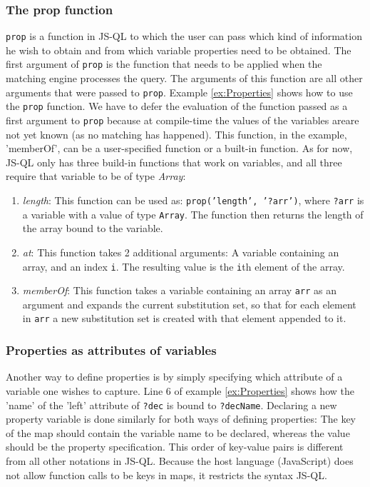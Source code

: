 \subsubsection*{The prop function}
 \texttt{prop} is a function in JS-QL to which the user can pass which kind of information he wish to obtain and from which variable properties need to be obtained. The first argument of \texttt{prop} is the function that needs to be applied when the matching engine processes the query. The arguments of this function are all other arguments that were passed to \texttt{prop}. Example \ref{ex:Properties} shows how to use the \texttt{prop} function. We have to defer the evaluation of the function passed as a first argument to \texttt{prop} because at compile-time the values of the variables areare not yet known (as no matching has happened). This function, in the example, 'memberOf', can be a user-specified function or a built-in function. As for now, JS-QL only has three build-in functions that work on variables, and all three require that variable to be of type \textit{Array}:


\begin{enumerate}
\item \textit{length}: This function can be used as: \texttt{prop('length', '?arr')}, where \texttt{?arr} is a variable with a value of type \texttt{Array}. The function then returns the length of the array bound to the variable.
\item \textit{at}: This function takes 2 additional arguments: A variable containing an array, and an index \texttt{i}. The resulting value is the \texttt{i}th element of the array.
\item \textit{memberOf}: This function takes a variable containing an array \texttt{arr} as an argument and expands the current substitution set, so that for each element in \texttt{arr} a new substitution set is created with that element appended to it.
\end{enumerate}

\subsubsection*{Properties as attributes of variables}
 Another way to define properties is by simply specifying which attribute of a variable one wishes to capture. Line 6 of example \ref{ex:Properties} shows how the 'name' of the 'left' attribute of \texttt{?dec} is bound to \texttt{?decName}. Declaring a new property variable is done similarly for both ways of defining properties: The key of the map should contain the variable name to be declared, whereas the value should be the property specification. This order of key-value pairs is different from all other notations in JS-QL. Because the host language (JavaScript) does not allow function calls to be keys in maps, it restricts the syntax JS-QL.

